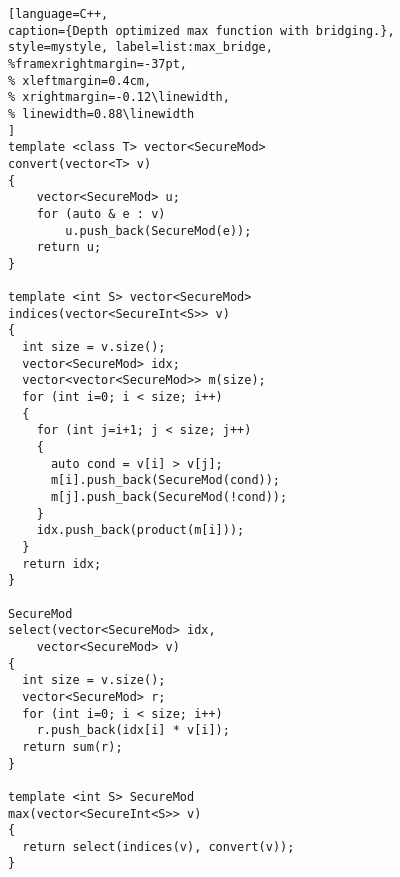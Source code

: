 \begin{figure}[t]
\begin{minipage}{\linewidth}
\begin{lstlisting}[language=C++,
caption={Depth optimized max function with bridging.},
style=mystyle, label=list:max_bridge,
%framexrightmargin=-37pt,
% xleftmargin=0.4cm,
% xrightmargin=-0.12\linewidth,
% linewidth=0.88\linewidth
]
template <class T> vector<SecureMod>
convert(vector<T> v)
{
    vector<SecureMod> u;
    for (auto & e : v)
        u.push_back(SecureMod(e));
    return u;
}

template <int S> vector<SecureMod>
indices(vector<SecureInt<S>> v)
{
  int size = v.size();
  vector<SecureMod> idx;
  vector<vector<SecureMod>> m(size);
  for (int i=0; i < size; i++)
  {
    for (int j=i+1; j < size; j++)
    {
      auto cond = v[i] > v[j];
      m[i].push_back(SecureMod(cond));
      m[j].push_back(SecureMod(!cond));
    }
    idx.push_back(product(m[i]));
  }
  return idx;
}

SecureMod
select(vector<SecureMod> idx,
    vector<SecureMod> v)
{
  int size = v.size();
  vector<SecureMod> r;
  for (int i=0; i < size; i++)
    r.push_back(idx[i] * v[i]);
  return sum(r);
}

template <int S> SecureMod
max(vector<SecureInt<S>> v)
{
  return select(indices(v), convert(v));
}
\end{lstlisting}
\end{minipage}
\end{figure}
